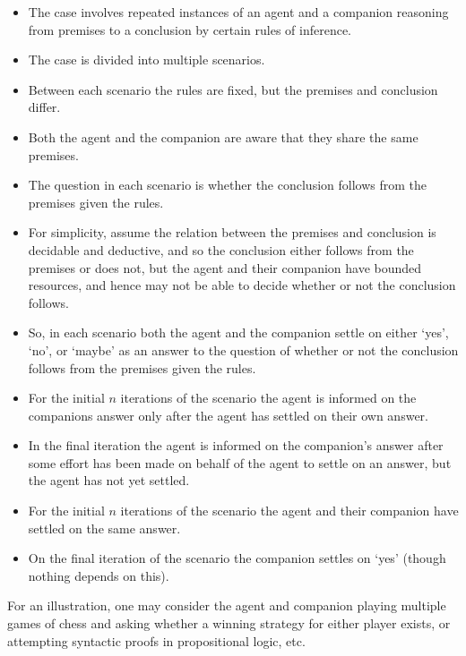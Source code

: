 \documentclass[10pt]{article}
\begin{document}
\begin{itemize}
\item The case involves repeated instances of an agent and a companion reasoning from premises to a conclusion by certain rules of inference.
\item The case is divided into multiple scenarios.
\item Between each scenario the rules are fixed, but the premises and conclusion differ.
\item Both the agent and the companion are aware that they share the same premises.
\item The question in each scenario is whether the conclusion follows from the premises given the rules.
\item For simplicity, assume the relation between the premises and conclusion is decidable and deductive, and so the conclusion either follows from the premises or does not, but the agent and their companion have bounded resources, and hence may not be able to decide whether or not the conclusion follows.
\item So, in each scenario both the agent and the companion settle on either `yes', `no', or `maybe' as an answer to the question of whether or not the conclusion follows from the premises given the rules.
\item For the initial \(n\) iterations of the scenario the agent is informed on the companions answer only after the agent has settled on their own answer.
\item In the final iteration the agent is informed on the companion's answer after some effort has been made on behalf of the agent to settle on an answer, but the agent has not yet settled.
\item For the initial \(n\) iterations of the scenario the agent and their companion have settled on the same answer.
\item On the final iteration of the scenario the companion settles on `yes' (though nothing depends on this).
\end{itemize}

For an illustration, one may consider the agent and companion playing multiple games of chess and asking whether a winning strategy for either player exists, or attempting syntactic proofs in propositional logic, etc.
\end{document}
